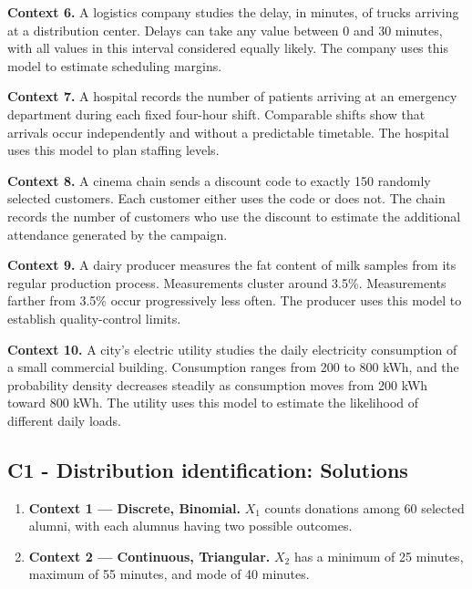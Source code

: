 {		\textbf{Context 6.} A logistics company studies the delay, in minutes,
		of trucks arriving at a distribution center. Delays can take any value
		between 0 and 30 minutes, with all values in this interval considered
		equally likely. The company uses this model to estimate scheduling
		margins.
		
		\textbf{Context 7.} A hospital records the number of patients arriving
		at an emergency department during each fixed four-hour shift.
		Comparable shifts show that arrivals occur independently and without
		a predictable timetable. The hospital uses this model to plan staffing
		levels.
		
		\textbf{Context 8.} A cinema chain sends a discount code to exactly
		150 randomly selected customers. Each customer either uses the code
		or does not. The chain records the number of customers who use the
		discount to estimate the additional attendance generated by the campaign.
		
		\textbf{Context 9.} A dairy producer measures the fat content of milk
		samples from its regular production process. Measurements cluster around
		3.5\%.
		Measurements farther from 3.5\% occur progressively less often. The
		producer uses this model to establish quality-control limits.
		
		\textbf{Context 10.} A city's electric utility studies the daily
		electricity consumption of a small commercial building. Consumption
		ranges from 200 to 800 kWh, and the probability density decreases
		steadily as consumption moves from 200 kWh toward 800 kWh. The utility
		uses this model to estimate the likelihood of different daily loads.
		
		
		\label{subsec:identifying-probability-distributions-c1-solution}
		\subsection*{C1 - Distribution identification: Solutions }
		
		\begin{enumerate}
			
			\item \textbf{Context 1 — Discrete, Binomial.}
			\(X_1\) counts donations among 60 selected alumni, with each alumnus
			having two possible outcomes.
			
			\item \textbf{Context 2 — Continuous, Triangular.}
			\(X_2\) has a minimum of 25 minutes, maximum of 55 minutes, and
			mode of 40 minutes.
			

\end{enumerate}}
